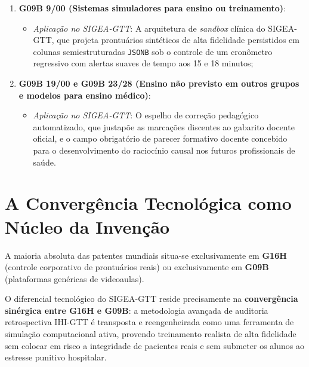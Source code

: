 \begin{enumerate}
    \item \textbf{G09B 9/00 (Sistemas simuladores para ensino ou treinamento)}:
    \begin{itemize}
        \item \textit{Aplicação no SIGEA-GTT}: A arquitetura de \textit{sandbox} clínica do SIGEA-GTT, que projeta prontuários sintéticos de alta fidelidade persistidos em colunas semiestruturadas \texttt{JSONB} sob o controle de um cronômetro regressivo com alertas suaves de tempo aos 15 e 18 minutos;
    \end{itemize}

    \item \textbf{G09B 19/00 e G09B 23/28 (Ensino não previsto em outros grupos e modelos para ensino médico)}:
    \begin{itemize}
        \item \textit{Aplicação no SIGEA-GTT}: O espelho de correção pedagógico automatizado, que justapõe as marcações discentes ao gabarito docente oficial, e o campo obrigatório de parecer formativo docente concebido para o desenvolvimento do raciocínio causal nos futuros profissionais de saúde.
    \end{itemize}
\end{enumerate}

\section{A Convergência Tecnológica como Núcleo da Invenção}
\label{sec_convergencia_tecnologica}

A maioria absoluta das patentes mundiais situa-se exclusivamente em \textbf{G16H} (controle corporativo de prontuários reais) ou exclusivamente em \textbf{G09B} (plataformas genéricas de videoaulas). 

O diferencial tecnológico do SIGEA-GTT reside precisamente na \textbf{convergência sinérgica entre G16H e G09B}: a metodologia avançada de auditoria retrospectiva IHI-GTT é transposta e reengenheirada como uma ferramenta de simulação computacional ativa, provendo treinamento realista de alta fidelidade sem colocar em risco a integridade de pacientes reais e sem submeter os alunos ao estresse punitivo hospitalar.
